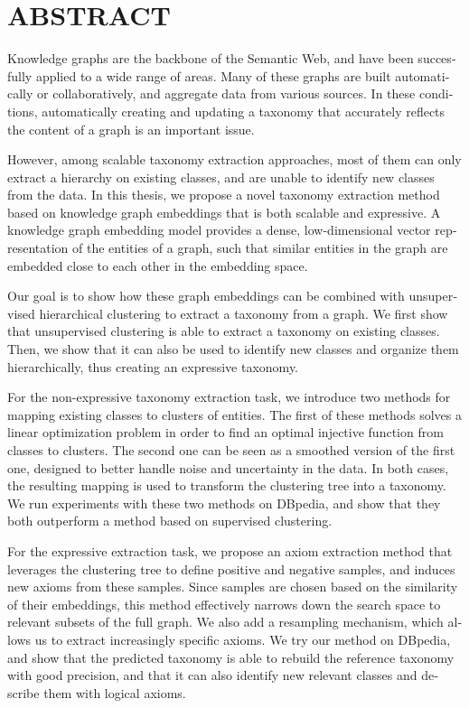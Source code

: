%

\chapter*{ABSTRACT}\thispagestyle{headings}
%
\begin{otherlanguage}{english}

Knowledge graphs are the backbone of the Semantic Web, and have been succesfully applied to a wide range of areas. Many of these graphs are built automatically or collaboratively, and aggregate data from various sources. In these conditions, automatically creating and updating a taxonomy that accurately reflects the content of a graph is an important issue.

However, among scalable taxonomy extraction approaches, most of them can only extract a hierarchy on existing classes, and are unable to identify new classes from the data. In this thesis, we propose a novel taxonomy extraction method based on knowledge graph embeddings that is both scalable and expressive. A knowledge graph embedding model provides a dense, low-dimensional vector representation of the entities of a graph, such that similar entities in the graph are embedded close to each other in the embedding space.

Our goal is to show how these graph embeddings can be combined with unsupervised hierarchical clustering to extract a taxonomy from a graph. We first show that unsupervised clustering is able to extract a taxonomy on existing classes. Then, we show that it can also be used to identify new classes and organize them hierarchically, thus creating an expressive taxonomy.

For the non-expressive taxonomy extraction task, we introduce two methods for mapping existing classes to clusters of entities. The first of these methods solves a linear optimization problem in order to find an optimal injective function from classes to clusters. The second one can be seen as a smoothed version of the first one, designed to better handle noise and uncertainty in the data. In both cases, the resulting mapping is used to transform the clustering tree into a taxonomy. We run experiments with these two methods on DBpedia, and show that they both outperform a method based on supervised clustering.

For the expressive extraction task, we propose an axiom extraction method that leverages the clustering tree to define positive and negative samples, and induces new axioms from these samples. Since samples are chosen based on the similarity of their embeddings, this method effectively narrows down the search space to relevant subsets of the full graph. We also add
a resampling mechanism, which allows us to extract increasingly specific axioms.
We try our method on DBpedia, and show that the predicted taxonomy is able to rebuild the reference taxonomy with good precision, and that it can also identify new relevant classes and describe them with logical axioms.


\end{otherlanguage}
